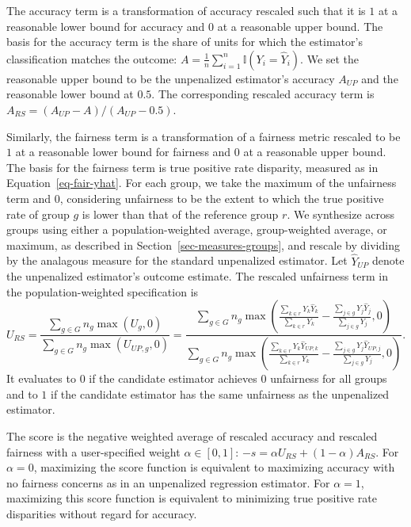 \documentclass[
  12pt]{article}
\begin{document}
The accuracy term is a transformation of accuracy rescaled such that it
is \(1\) at a reasonable lower bound for accuracy and \(0\) at a
reasonable upper bound. The basis for the accuracy term is the share of
units for which the estimator's classification matches the outcome:
\(A = \frac1n \sum_{i=1}^n \mathbb{I}(Y_i= \hat Y_{i})\). We set the
reasonable upper bound to be the unpenalized estimator's accuracy
\(A_{UP}\) and the reasonable lower bound at \(0.5\). The corresponding
rescaled accuracy term is \(A_{RS} = (A_{UP} - A)/(A_{UP} - 0.5)\).

Similarly, the fairness term is a transformation of a fairness metric
rescaled to be \(1\) at a reasonable lower bound for fairness and \(0\)
at a reasonable upper bound. The basis for the fairness term is true
positive rate disparity, measured as in Equation~\ref{eq-fair-yhat}. For
each group, we take the maximum of the unfairness term and \(0\),
considering unfairness to be the extent to which the true positive rate
of group \(g\) is lower than that of the reference group \(r\). We
synthesize across groups using either a population-weighted average,
group-weighted average, or maximum, as described in
Section~\ref{sec-measures-groups}, and rescale by dividing by the
analagous measure for the standard unpenalized estimator. Let
\(\hat Y_{UP}\) denote the unpenalized estimator's outcome estimate. The
rescaled unfairness term in the population-weighted specification is \[
U_{RS} = \frac{\sum_{g \in G}n_g \max \left( U_g, 0\right)}{\sum_{g \in G}n_g \max \left( U_{UP,g},0\right)} = 
\frac{\sum_{g \in G}n_g \max \left( \frac{\sum_{k\in r}Y_k\hat Y_k}{\sum_{k\in r}Y_k} - \frac{\sum_{j\in g}Y_j \hat Y_{j}}{\sum_{j\in g}Y_j}, 0\right)}{\sum_{g \in G}n_g \max \left(\frac{\sum_{k\in r}Y_k\hat Y_{UP,k}}{\sum_{k\in r}Y_k} - \frac{\sum_{j\in g}Y_j\hat Y_{UP,j}}{\sum_{j\in g}Y_j},0\right)}.
\] It evaluates to \(0\) if the candidate estimator achieves \(0\)
unfairness for all groups and to \(1\) if the candidate estimator has
the same unfairness as the unpenalized estimator.

The score is the negative weighted average of rescaled accuracy and
rescaled fairness with a user-specified weight \(\alpha \in [0,1]\):
\(-s = \alpha U_{RS} + (1-\alpha) A_{RS}\). For \(\alpha = 0\),
maximizing the score function is equivalent to maximizing accuracy with
no fairness concerns as in an unpenalized regression estimator. For
\(\alpha = 1\), maximizing this score function is equivalent to
minimizing true positive rate disparities without regard for accuracy.
\end{document}
